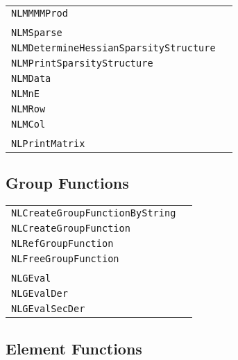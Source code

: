 \documentclass[12pt]{article}
\begin{document}
\begin{center}
\begin{tabular}{ll}
\tt NLMMMMProd&\pageref{Subroutine:NLMMMMProd}\\
\\
\tt NLMSparse&\pageref{Subroutine:NLMSparse}\\
\tt NLMDetermineHessianSparsityStructure&\pageref{Subroutine:NLMDetermineHessianSparsityStructure}\\
\tt NLMPrintSparsityStructure&\pageref{Subroutine:NLMPrintSparsityStructure}\\
\tt NLMData&\pageref{Subroutine:NLMData}\\
\tt NLMnE&\pageref{Subroutine:NLMnE}\\
\tt NLMRow&\pageref{Subroutine:NLMRow}\\
\tt NLMCol&\pageref{Subroutine:NLMCol}\\
\\
\tt NLPrintMatrix&\pageref{Subroutine:NLPrintMatrix}\\
\end{tabular}
\end{center}

\subsection{Group Functions}

\begin{center}
\begin{tabular}{ll}
\tt NLCreateGroupFunctionByString&\pageref{Subroutine:NLCreateGroupFunctionByString}\\
\tt NLCreateGroupFunction&\pageref{Subroutine:NLCreateGroupFunction}\\
\tt NLRefGroupFunction&\pageref{Subroutine:NLRefGroupFunction}\\
\tt NLFreeGroupFunction&\pageref{Subroutine:NLFreeGroupFunction}\\
\\
\tt NLGEval&\pageref{Subroutine:NLGEval}\\
\tt NLGEvalDer&\pageref{Subroutine:NLGEvalDer}\\
\tt NLGEvalSecDer&\pageref{Subroutine:NLGEvalSecDer}\\
\end{tabular}
\end{center}

\subsection{Element Functions}
\end{document}
